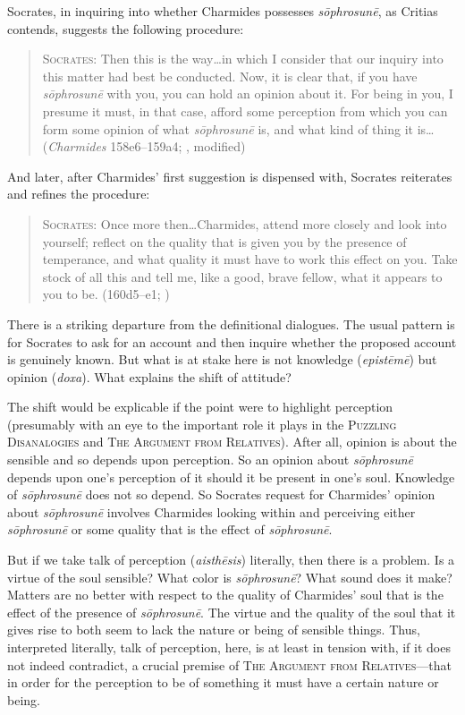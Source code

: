 Socrates, in inquiring into whether Charmides possesses \emph{sōphrosunē}, as Critias contends, suggests the following procedure:
\begin{quote}
	\textsc{Socrates}: Then this is the way\dots in which I consider that our inquiry into this matter had best be conducted. Now, it is clear that, if you have \emph{sōphrosunē} with you, you can hold an opinion about it. For being in you, I presume it must, in that case, afford some perception from which you can form some opinion of what \emph{sōphrosunē} is, and what kind of thing it is\ldots (\emph{Charmides} 158e6–159a4; \citealt[27]{Lamb:1927qw}, modified)
\end{quote}
And later, after Charmides' first suggestion is dispensed with, Socrates reiterates and refines the procedure:
\begin{quote}
	\textsc{Socrates}: Once more then\ldots Charmides, attend more closely and look into yourself; reflect on the quality that is given you by the presence of temperance, and what quality it must have to work this effect on you. Take stock of all this and tell me, like a good, brave fellow, what it appears to you to be. (160d5–e1; \citealt{Lamb:1927qw})
\end{quote}
There is a striking departure from the definitional dialogues. The usual pattern is for Socrates to ask for an account and then inquire whether the proposed account is genuinely known. But what is at stake here is not knowledge (\emph{epistēmē}) but opinion (\emph{doxa}). What explains the shift of attitude?

The shift would be explicable if the point were to highlight perception (presumably with an eye to the important role it plays in the \textsc{Puzzling Disanalogies} and \textsc{The Argument from Relatives}). After all, opinion is about the sensible and so depends upon perception. So an opinion about \emph{sōphrosunē} depends upon one's perception of it should it be present in one's soul. Knowledge of \emph{sōphrosunē} does not so depend. So Socrates request for Charmides' opinion about \emph{sōphrosunē} involves Charmides looking within and perceiving either \emph{sōphrosunē} or some quality that is the effect of \emph{sōphrosunē}. 

But if we take talk of perception (\emph{aisthēsis}) literally, then there is a problem. Is a virtue of the soul sensible? What color is \emph{sōphrosunē}? What sound does it make? Matters are no better with respect to the quality of Charmides' soul that is the effect of the presence of \emph{sōphrosunē}. The virtue and the quality of the soul that it gives rise to both seem to lack the nature or being of sensible things. Thus, interpreted literally, talk of perception, here, is at least in tension with, if it does not indeed contradict, a crucial premise of \textsc{The Argument from Relatives}—that in order for the perception to be of something it must have a certain nature or being.

